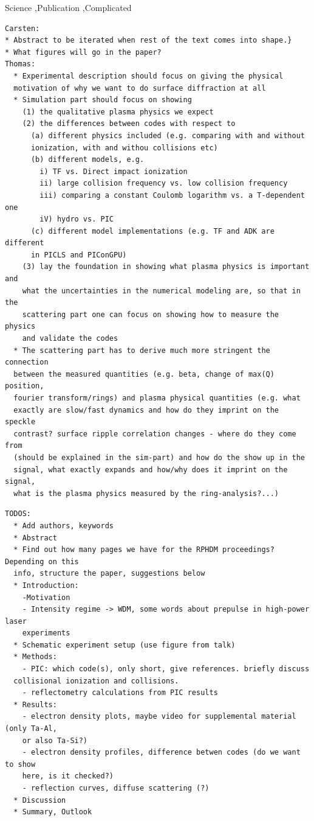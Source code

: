 \documentclass[preprint, 12pt]{elsarticle}
\begin{document}
\begin{frontmatter}
\begin{keyword}
Science \sep Publication \sep Complicated


\end{keyword}

\end{frontmatter}

\begin{verbatim}
Carsten:
* Abstract to be iterated when rest of the text comes into shape.}
* What figures will go in the paper?
Thomas:
  * Experimental description should focus on giving the physical
  motivation of why we want to do surface diffraction at all
  * Simulation part should focus on showing
    (1) the qualitative plasma physics we expect
    (2) the differences between codes with respect to
      (a) different physics included (e.g. comparing with and without
      ionization, with and withou collisions etc)
      (b) different models, e.g.
        i) TF vs. Direct impact ionization
        ii) large collision frequency vs. low collision frequency
        iii) comparing a constant Coulomb logarithm vs. a T-dependent one
        iV) hydro vs. PIC
      (c) different model implementations (e.g. TF and ADK are different
      in PICLS and PIConGPU)
    (3) lay the foundation in showing what plasma physics is important and
    what the uncertainties in the numerical modeling are, so that in the
    scattering part one can focus on showing how to measure the physics
    and validate the codes
  * The scattering part has to derive much more stringent the connection
  between the measured quantities (e.g. beta, change of max(Q) position,
  fourier transform/rings) and plasma physical quantities (e.g. what
  exactly are slow/fast dynamics and how do they imprint on the speckle
  contrast? surface ripple correlation changes - where do they come from
  (should be explained in the sim-part) and how do the show up in the
  signal, what exactly expands and how/why does it imprint on the signal,
  what is the plasma physics measured by the ring-analysis?...)
\end{verbatim}
\begin{verbatim}
TODOS:
  * Add authors, keywords
  * Abstract
  * Find out how many pages we have for the RPHDM proceedings? Depending on this
  info, structure the paper, suggestions below
  * Introduction:
    -Motivation
    - Intensity regime -> WDM, some words about prepulse in high-power laser
    experiments
  * Schematic experiment setup (use figure from talk)
  * Methods:
    - PIC: which code(s), only short, give references. briefly discuss
  collisional ionization and collisions.
    - reflectometry calculations from PIC results
  * Results:
    - electron density plots, maybe video for supplemental material (only Ta-Al,
    or also Ta-Si?)
    - electron density profiles, difference betwen codes (do we want to show
    here, is it checked?)
    - reflection curves, diffuse scattering (?)
  * Discussion
  * Summary, Outlook
\end{verbatim}
\end{document}

